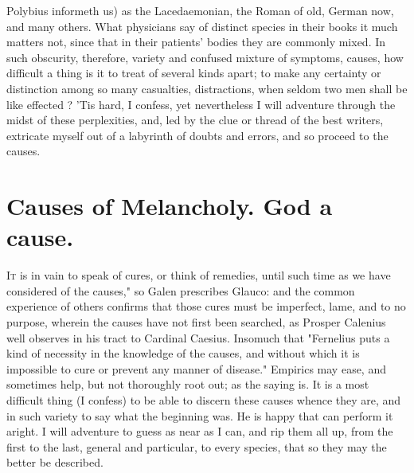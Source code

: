 Polybius informeth us) as the Lacedaemonian, the Roman of
old, German now, and many others. What physicians say of distinct species in
their books it much matters not, since that in their patients' bodies they are
commonly mixed. In such obscurity, therefore, variety and confused mixture of
symptoms, causes, how difficult a thing is it to treat of several kinds apart;
to make any certainty or distinction among so many casualties, distractions,
when seldom two men shall be like effected ? 'Tis hard, I
confess, yet nevertheless I will adventure through the midst of these
perplexities, and, led by the clue or thread of the best writers, extricate
myself out of a labyrinth of doubts and errors, and so proceed to the causes.



\section{Causes of Melancholy. God a cause.}\label{sec:causes-of-melancholy}

\lettrine[ante={\large{}"}]{I}{t} is in vain to speak of cures, or think of remedies,
until such time as we have considered of the causes," so
Galen prescribes Glauco: and the common experience of
others confirms that those cures must be imperfect, lame, and to no purpose,
wherein the causes have not first been searched, as
Prosper Calenius well observes in his tract
 to Cardinal Caesius. Insomuch that
"Fernelius puts a kind of necessity in the knowledge of
the causes, and without which it is impossible to cure or prevent any manner of
disease." Empirics may ease, and sometimes help, but not thoroughly root out;
 as the saying is. It is a most difficult thing (I confess)
to be able to discern these causes whence they are, and in such
variety to say what the beginning was.
He is happy that can perform it aright. I will adventure
to guess as near as I can, and rip them all up, from the first to the last,
general and particular, to every species, that so they may the better be
described.

